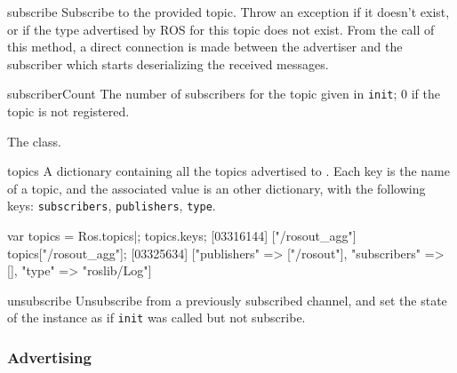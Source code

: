 \begin{urbiscriptapi}
\item[subscribe]%
  Subscribe to the provided topic. Throw an exception if it doesn't exist, or
  if the type advertised by ROS for this topic does not exist.  From the
  call of this method, a direct connection is made between the advertiser
  and the subscriber which starts deserializing the received messages.


\item[subscriberCount]%
  The number of subscribers for the topic given in \lstinline{init}; 0 if
  the topic is not registered.


\item[Topic]%
  The  class.


\item[topics]%
  A dictionary containing all the topics advertised to
  . Each key is the name of a topic, and the associated
  value is an other dictionary, with the following keys:
  \lstinline{subscribers}, \lstinline{publishers}, \lstinline{type}.
\begin{urbiscript}
var topics = Ros.topics|;
topics.keys;
[03316144] ["/rosout_agg"]
topics["/rosout_agg"];
[03325634] ["publishers" => ["/rosout"], "subscribers" => [], "type" => "roslib/Log"]
\end{urbiscript}


\item[unsubscribe]%
  Unsubscribe from a previously subscribed channel, and set the state of the
  instance as if \lstinline{init} was called but not subscribe.
\end{urbiscriptapi}


\subsubsection{Advertising}

